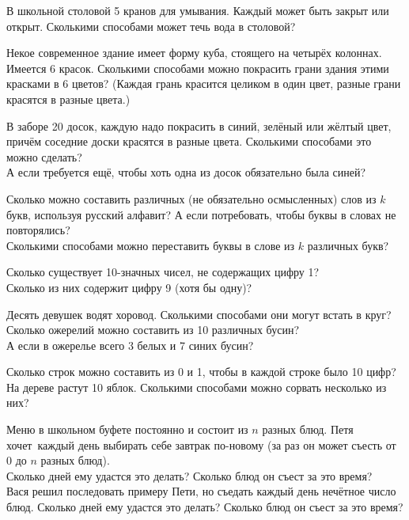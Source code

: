 \documentclass[12pt,a4paper]{article}
\begin{document}

В школьной столовой 5 кранов для умывания. Каждый может быть закрыт или
открыт. Сколькими способами может течь вода в столовой?

 Некое современное здание имеет форму куба, стоящего на
четырёх колоннах. Имеется 6 красок. Сколькими способами можно
покрасить грани здания этими красками в 6 цветов? (Каждая грань
красится целиком в один цвет, разные грани красятся в разные цвета.)

 В заборе 20 досок, каждую надо покрасить в синий,
зелёный или жёлтый цвет, причём соседние доски красятся в разные
цвета. Сколькими способами это можно сделать? \\
 А если
требуется ещё, чтобы хоть одна из досок обязательно была синей?

Сколько можно составить различных
(не обязательно осмысленных) слов из $k$ букв,
используя русский алфавит?
А если потребовать, чтобы буквы в словах не повторялись?\\
Сколькими способами можно переставить буквы в слове из $k$ различных букв?


 Сколько существует 10-значных чисел, не содержащих
цифру 1?\\
 Сколько из них содержит цифру 9 (хотя бы одну)?


Десять девушек водят хоровод. Сколькими способами они могут встать
в круг?\\
Сколько ожерелий можно составить из 10 различных бусин?\\
 А если в ожерелье всего 3 белых и 7 синих бусин?

Сколько строк можно составить из 0 и 1, чтобы в каждой строке было 10 цифр?\\
На дереве растут 10 яблок. Сколькими способами можно сорвать
несколько из них?

 Меню в школьном буфете постоянно и состоит из $n$ разных
блюд. Петя хочет~каждый день выбирать себе завтрак по-новому
(за раз он может съесть от 0 до $n$ разных блюд).\\
 Сколько дней ему удастся это делать?
 Сколько блюд он съест за это время? \\
 Вася решил последовать
примеру Пети, но съедать каждый день нечётное число блюд. Сколько
дней ему удастся это делать?
  Сколько блюд он съест за это время?
\end{document}
